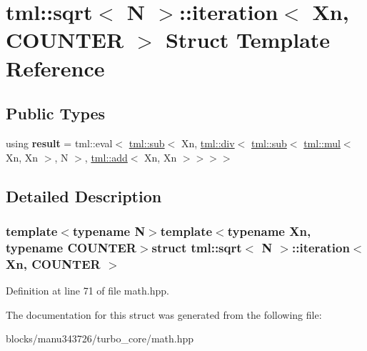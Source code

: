 \hypertarget{structtml_1_1sqrt_1_1iteration}{\section{tml\+:\+:sqrt$<$ N $>$\+:\+:iteration$<$ Xn, C\+O\+U\+N\+T\+E\+R $>$ Struct Template Reference}
\label{structtml_1_1sqrt_1_1iteration}
}
\subsection*{Public Types}
\begin{DoxyCompactItemize}
\item 
\hypertarget{structtml_1_1sqrt_1_1iteration_a2f9482daa576f06b305b65a80943c7c6}{using {\bfseries result} = tml\+::eval$<$ \hyperlink{structtml_1_1sub}{tml\+::sub}$<$ Xn, \hyperlink{structtml_1_1div}{tml\+::div}$<$ \hyperlink{structtml_1_1sub}{tml\+::sub}$<$ \hyperlink{structtml_1_1mul}{tml\+::mul}$<$ Xn, Xn $>$, N $>$, \hyperlink{structtml_1_1add}{tml\+::add}$<$ Xn, Xn $>$$>$$>$$>$}\label{structtml_1_1sqrt_1_1iteration_a2f9482daa576f06b305b65a80943c7c6}

\end{DoxyCompactItemize}


\subsection{Detailed Description}
\subsubsection*{template$<$typename N$>$template$<$typename Xn, typename C\+O\+U\+N\+T\+E\+R$>$struct tml\+::sqrt$<$ N $>$\+::iteration$<$ Xn, C\+O\+U\+N\+T\+E\+R $>$}



Definition at line 71 of file math.\+hpp.



The documentation for this struct was generated from the following file\+:\begin{DoxyCompactItemize}
\item 
blocks/manu343726/turbo\+\_\+core/math.\+hpp\end{DoxyCompactItemize}
